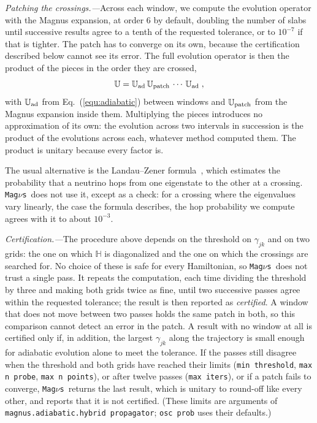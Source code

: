 \documentclass[final,5p,times,twocolumn,sort,compress]{elsarticle}
\makeatletter
\newcommand{\eq}{Eq.}
\DeclareRobustCommand{\_}{%
  \ifmmode\nfss@text{\textunderscore}\else\textunderscore\allowbreak\fi}
\newcommand{\equ}[1]{\eq~(\ref{equ:#1})}
\newcommand{\magnus}{{\tt Mag}\ensuremath{\nu}{\tt s}}
\makeatother
\begin{document}
\smallskip

\textit{Patching the crossings.---}Across each window, we compute the evolution operator with the Magnus expansion, at order 6 by default, doubling the number of slabs until successive results agree to a tenth of the requested tolerance, or to $10^{-7}$ if that is tighter. The patch has to converge on its own, because the certification described below cannot see its error. The full evolution operator is then the product of the pieces in the order they are crossed,
\begin{equation}
 \label{equ:hybrid_composition}
 \mathbb{U}
 =
 \mathbb{U}_{\rm ad}\,\mathbb{U}_{\rm patch}\, \cdots \,\mathbb{U}_{\rm ad} \;,
\end{equation}
with $\mathbb{U}_{\rm ad}$ from \equ{adiabatic} between windows and $\mathbb{U}_{\rm patch}$ from the Magnus expansion inside them. Multiplying the pieces introduces no approximation of its own: the evolution across two intervals in succession is the product of the evolutions across each, whatever method computed them. The product is unitary because every factor is.

The usual alternative is the Landau--Zener formula\ \cite{Zener:1932ws}, which estimates the probability that a neutrino hops from one eigenstate to the other at a crossing. \magnus\ does not use it, except as a check: for a crossing where the eigenvalues vary linearly, the case the formula describes, the hop probability we compute agrees with it to about $10^{-3}$.

\smallskip

\textit{Certification.---}The procedure above depends on the threshold on $\gamma_{jk}$ and on two grids: the one on which $\mathbb{H}$ is diagonalized and the one on which the crossings are searched for. No choice of these is safe for every Hamiltonian, so \magnus\ does not trust a single pass. It repeats the computation, each time dividing the threshold by three and making both grids twice as fine, until two successive passes agree within the requested tolerance; the result is then reported as \emph{certified}. A window that does not move between two passes holds the same patch in both, so this comparison cannot detect an error in the patch. A result with no window at all is certified only if, in addition, the largest $\gamma_{jk}$ along the trajectory is small enough for adiabatic evolution alone to meet the tolerance. If the passes still disagree when the threshold and both grids have reached their limits ({\tt min\_threshold}, {\tt max\_n\_probe}, {\tt max\_n\_points}), or after twelve passes ({\tt max\_iters}), or if a patch fails to converge, \magnus\ returns the last result, which is unitary to round-off like every other, and reports that it is not certified. (These limits are arguments of {\tt magnus.adiabatic.hybrid\_propagator}; {\tt osc\_prob} uses their defaults.)
\end{document}
